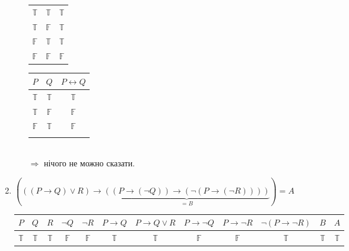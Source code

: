 \documentclass[a4paper,12pt]{article}
\begin{document}
\begin{enumerate}
\begin{enumerate}
\begin{table}[!htb]
\begin{minipage}{.4\linewidth}
\begin{tabular}{|c|c|c|}
$\mathbb{T}$ & $\mathbb{T}$ & $\mathbb{T}$                         \\ 
$\mathbb{T}$ & $\mathbb{F}$ & $\mathbb{T}$                         \\ 
$\mathbb{F}$ & $\mathbb{T}$ & $\mathbb{T}$                         \\ 
$\mathbb{F}$ & $\mathbb{F}$ & \cellcolor[HTML]{FFCCC9}$\mathbb{F}$ \\ \hline
\end{tabular}
    \end{minipage}%
    \begin{minipage}{.4\linewidth}
      \centering

        \begin{tabular}{|c|c|c|}
\hline
$P$          & $Q$          & $P\leftrightarrow Q$ \\ \hline
$\mathbb{T}$ & $\mathbb{T}$ & $\mathbb{T}$         \\ 
$\mathbb{T}$ & $\mathbb{F}$ & $\mathbb{F}$         \\ 
$\mathbb{F}$ & $\mathbb{T}$ & $\mathbb{F}$         \\ 
\rowcolor[HTML]{FFCCC9} 
 &  &         \\ \hline
\end{tabular}
    \end{minipage} 
\end{table}\\
$\Rightarrow$  нічого не можно сказати.
\end{enumerate}
\item $(((P\rightarrow Q)\lor R)\rightarrow\underbrace{((P\rightarrow(\neg Q))\rightarrow (\neg(P\rightarrow(\neg R))))}_{=B})=A$
\begin{table}[htp]
\centering
\begin{tabular}{|c|c|c|c|c|c|c|c|c|c|c|c|}
\hline
\multicolumn{1}{|c|}{$P$} & \multicolumn{1}{c|}{$Q$} & \multicolumn{1}{c|}{$R$} & \multicolumn{1}{c|}{$\neg Q$} & \multicolumn{1}{c|}{$\neg R$} & \multicolumn{1}{c|}{$P\rightarrow Q$} & \multicolumn{1}{c|}{$P\rightarrow Q\lor R$} & \multicolumn{1}{c|}{$P\rightarrow\neg Q$} & \multicolumn{1}{c|}{$P\rightarrow\neg R$} & \multicolumn{1}{c|}{$\neg(P\rightarrow\neg R)$} & \multicolumn{1}{c|}{$B$} & \multicolumn{1}{c|}{$A$}               \\ \hline
$\mathbb{T}$                & $\mathbb{T}$             & $\mathbb{T}$             & $\mathbb{F}$                  & $\mathbb{F}$                  & $\mathbb{T}$                          & $\mathbb{T}$                                & $\mathbb{F}$                              & $\mathbb{F}$                              & $\mathbb{T}$                                    & $\mathbb{T}$                                                                     & $\mathbb{T}$                         \\

\end{tabular}
\end{table}
\end{enumerate}
\end{document}
